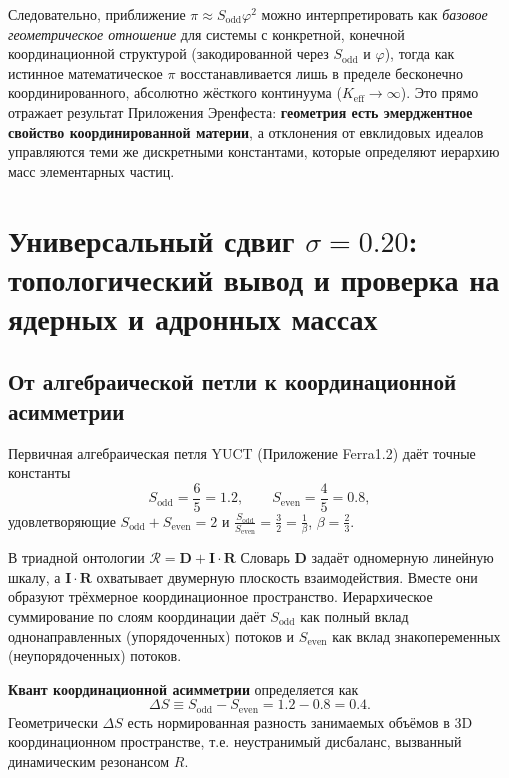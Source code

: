 \documentclass[11pt,a4paper]{article}
\theoremstyle{remark}
\begin{document}
	Следовательно, приближение \(\pi \approx S_{\mathrm{odd}}\varphi^2\) можно интерпретировать как \emph{базовое геометрическое отношение} для системы с конкретной, конечной координационной структурой (закодированной через \(S_{\mathrm{odd}}\) и \(\varphi\)), тогда как истинное математическое \(\pi\) восстанавливается лишь в пределе бесконечно координированного, абсолютно жёсткого континуума (\(K_{\mathrm{eff}} \to \infty\)). Это прямо отражает результат Приложения Эренфеста: \textbf{геометрия есть эмерджентное свойство координированной материи}, а отклонения от евклидовых идеалов управляются теми же дискретными константами, которые определяют иерархию масс элементарных частиц.
	
	\section{Универсальный сдвиг \(\sigma = 0.20\): топологический вывод и проверка на ядерных и адронных массах}
	\label{sec:sigma}
	
	\subsection{От алгебраической петли к координационной асимметрии}
	
	Первичная алгебраическая петля YUCT (Приложение Ferra1.2) даёт точные константы
	\begin{equation}
		S_{\mathrm{odd}} = \frac{6}{5} = 1.2,\qquad S_{\mathrm{even}} = \frac{4}{5} = 0.8,
	\end{equation}
	удовлетворяющие \(\displaystyle S_{\mathrm{odd}}+S_{\mathrm{even}}=2\) и \(\displaystyle \frac{S_{\mathrm{odd}}}{S_{\mathrm{even}}}=\frac{3}{2}=\frac{1}{\beta}\), \(\beta=\frac{2}{3}\).
	
	В триадной онтологии \(\mathcal{R}=\mathbf{D}+\mathbf{I}\!\cdot\!\mathbf{R}\) Словарь \(\mathbf{D}\) задаёт одномерную линейную шкалу, а \(\mathbf{I}\!\cdot\!\mathbf{R}\) охватывает двумерную плоскость взаимодействия. Вместе они образуют трёхмерное координационное пространство. Иерархическое суммирование по слоям координации даёт \(S_{\mathrm{odd}}\) как полный вклад однонаправленных (упорядоченных) потоков и \(S_{\mathrm{even}}\) как вклад знакопеременных (неупорядоченных) потоков.
	
	\textbf{Квант координационной асимметрии} определяется как
	\begin{equation}
		\Delta S \equiv S_{\mathrm{odd}} - S_{\mathrm{even}} = 1.2 - 0.8 = 0.4.
		\label{eq:DS}
	\end{equation}
	Геометрически \(\Delta S\) есть нормированная разность занимаемых объёмов в 3D координационном пространстве, т.е. неустранимый дисбаланс, вызванный динамическим резонансом \(R\).
	
\end{document}
